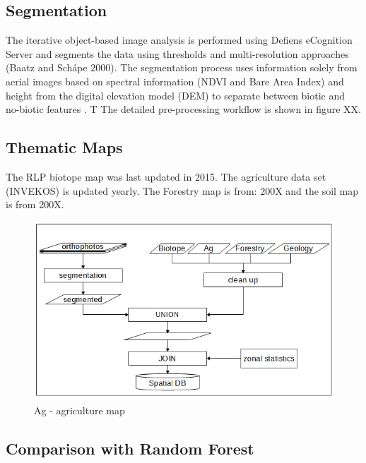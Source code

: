 \documentclass[authoryear, review,12pt,number]{elsarticle}
\begin{document}
\subsection{Segmentation} The iterative object-based image analysis is
performed using Defiens eCognition Server and segments the data using
thresholds and multi-resolution approaches (Baatz and Sch\'ape 2000). The
segmentation process uses information solely from aerial images based on
spectral information (NDVI and Bare Area Index) and height from the digital
elevation model (DEM) to separate between biotic and no-biotic features
\citep{Tintrup2015}. T The detailed pre-processing workflow is shown in figure
XX.
\subsection{Thematic Maps} The RLP biotope map was last updated in 2015. The
agriculture data set (INVEKOS) is updated yearly. The Forestry map is from:
200X and the soil map is from 200X.

\begin{figure} \includegraphics[width=1\textwidth]{diagrams/pre_processing.png}
    \caption{Ag - agriculture map} \end{figure}

\subsection{Comparison with Random Forest}
\end{document}
